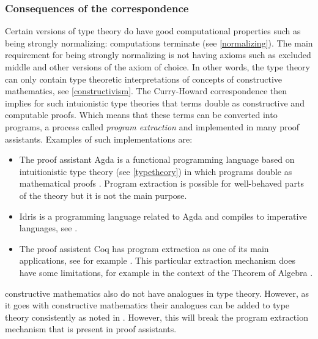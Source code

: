 \documentclass[12pt,a4paper,twoside,xetex]{book}
\newcommand{\keyword}[1]{\emph{#1}\index{#1}}
\begin{document}
\subsubsection{Consequences of the correspondence}

Certain versions of type theory do have good computational properties such as 
being strongly normalizing: computations terminate (see \cref{normalizing}). 
The main requirement for being strongly normalizing is not having axioms such 
as excluded middle and other versions of the axiom of choice. In other words, 
the type theory can only contain type theoretic interpretations of concepts of 
constructive mathematics, see \cref{constructivism}. The Curry-Howard 
correspondence then implies for such intuionistic type theories that terms 
double as constructive and computable proofs. Which means that these terms can 
be converted into programs, a process called \keyword{program extraction} and 
implemented in many proof assistants. Examples of such implementations are:
\begin{itemize}
\item The proof assistant Agda is a functional programming language based on 
intuitionistic type theory (see \cref{typetheory}) in which programs double as 
mathematical proofs \cite{Abel2019}. Program extraction is possible for 
well-behaved parts of the theory but it is not the main purpose.
\item Idris is a programming language related to Agda and compiles to imperative 
languages, see \cite{Brady2018}.
\item   The proof assistent Coq \cite{Arias2019} has program extraction as one 
of its main applications, see for example \cite{Pit-Claudel2018}. This 
particular extraction mechanism does have some limitations, for example in the 
context of the Theorem of Algebra \cite{Cruz-Filipe2005}. %
\end{itemize}

%

constructive mathematics also do not have analogues in type theory. However, as 
it goes with constructive mathematics their analogues can be added to type 
theory consistently as noted in \cite{Altenkirch2017}. However, this will break 
the program extraction mechanism that is present in proof assistants.
\end{document}
